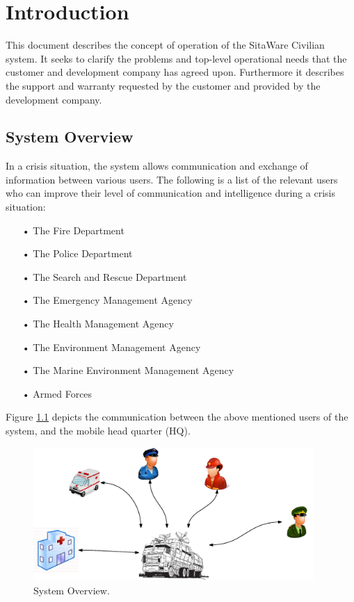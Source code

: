 \chapter{Introduction}
This document describes the concept of operation of the SitaWare Civilian system. It seeks to clarify the problems and top-level operational needs that the customer and development company has agreed upon. Furthermore it describes the support and warranty requested by the customer and provided by the development company. 

\section{System Overview}
In a crisis situation, the system allows communication and exchange of information between various users. The following is a list of the relevant users who can improve their level of communication and intelligence during a crisis situation:

\begin{enumerate}
\item[•] The Fire Department
\item[•] The Police Department
\item[•] The Search and Rescue Department
\item[•] The Emergency Management Agency
\item[•] The Health Management Agency
\item[•] The Environment Management Agency
\item[•] The Marine Environment Management Agency
\item[•] Armed Forces
\end{enumerate}

Figure \ref{fig:system_overview} depicts the communication between the above mentioned users of the system, and the mobile head quarter (HQ). 

\begin{figure}[H]
\centering
\includegraphics[width=0.95\textwidth]
{billeder/system_overview.pdf}
\caption{System Overview.}
\label{fig:system_overview}
\end{figure}


